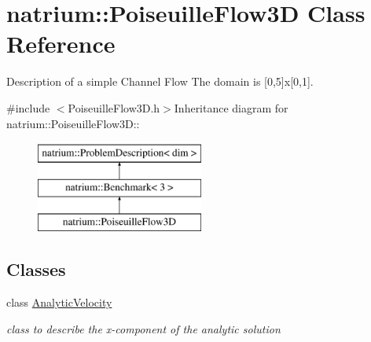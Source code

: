 \hypertarget{classnatrium_1_1PoiseuilleFlow3D}{
\section{natrium::PoiseuilleFlow3D Class Reference}
\label{classnatrium_1_1PoiseuilleFlow3D}
}


Description of a simple Channel Flow The domain is \mbox{[}0,5\mbox{]}x\mbox{[}0,1\mbox{]}.  


{\ttfamily \#include $<$PoiseuilleFlow3D.h$>$}Inheritance diagram for natrium::PoiseuilleFlow3D::\begin{figure}[H]
\begin{center}
\leavevmode
\includegraphics[height=3cm]{classnatrium_1_1PoiseuilleFlow3D}
\end{center}
\end{figure}
\subsection*{Classes}
\begin{DoxyCompactItemize}
\item 
class \hyperlink{classnatrium_1_1PoiseuilleFlow3D_1_1AnalyticVelocity}{AnalyticVelocity}
\begin{DoxyCompactList}\small\item\em class to describe the x-\/component of the analytic solution \item\end{DoxyCompactList}\end{DoxyCompactItemize}
